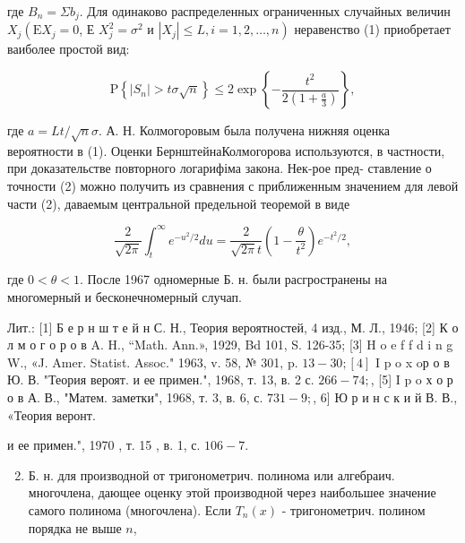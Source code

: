 \documentclass[10pt]{article}
\begin{document}
где $B_{n}=\Sigma b_{j}$. Для одинаково распределенных ограниченных случайных величин $X_{j}\left(\mathrm{E} X_{j}=0\right.$, Е $X_{j}^{2}=\sigma^{2}$ и $\left.\left|X_{j}\right| \leqslant L, i=1,2, \ldots, n\right)$ неравенство (1) приобретает ваиболее простой вид:



\[

\mathrm{P}\left\{\left|S_{n}\right|>t \sigma \sqrt{n}\right\} \leqslant 2 \exp \left\{-\frac{t^{2}}{2\left(1+\frac{a}{3}\right)}\right\},

\]



где $a=L t / \sqrt{n} \sigma$. А. Н. Колмогоровым была получена нижняя оценка вероятности в (1). Оценки БернштейнаКолмогорова используются, в частности, при доказательстве повторного логарифіма закона. Нек-рое пред- ставление о точности (2) можно получить из сравнения с приближенным значением для левой части (2), даваемым центральной предельной теоремой в виде



\[

\frac{2}{\sqrt{2 \pi}} \int_{t}^{\infty} e^{-u^{2} / 2} d u=\frac{2}{\sqrt{2 \pi} t}\left(1-\frac{\theta}{t^{2}}\right) e^{-t^{2} / 2},

\]



где $0<\theta<1$. После 1967 одномерные Б. н. были расгространены на многомерный и бесконечномерный случап.



Лит.: [1] Б е р н ш т е й н С. Н., Теория вероятностей, 4 изд., М. Л., 1946; [2] К о л м о г о р о в A. H., “Math. Ann.», 1929, Bd 101, S. 126-35; [3] H o e f f d i n g W., «J. Amer. Statist. Assoc." 1963, v. 58, № 301, p. $13-30 ;[4]$ I p o x oр о в Ю. В. "Теория вероят. и ее примен.", 1968, т. 13, в. 2 с. $266-74 ;$, [5] I p o х о р о в А. В., "Матем. заметки", 1968, т. 3, в. 6, с. $731-9 ;$, 6] Ю р и н с к и й В. В., «Теория веронт.

и ее примен.", 1970 , т. 15 , в. 1, с. $106-7$.



\begin{enumerate}

  \setcounter{enumi}{1}

  \item Б. н. для производной от тригонометрич. полинома или алгебраич. многочлена, дающее оценку этой производной через наибольшее значение самого полинома (многочлена). Если $T_{n}(x)$ - тригонометрич. полином порядка не выше $n$,

\end{enumerate}
\end{document}
